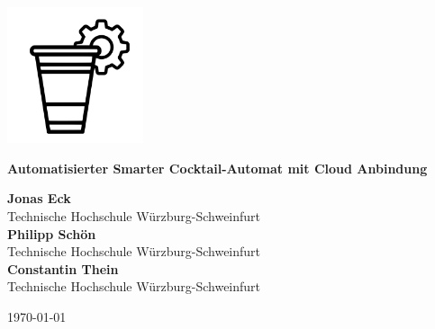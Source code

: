 \documentclass[a4paper, 10pt]{article} %
\begin{document}
\begin{titlepage}
    \begin{flushleft}
		\vspace*{-1.5cm}            %
		\hspace*{-1.0cm}           %
        \includegraphics[width=4cm]{graphics/images/smartender_logo.png} %
    \end{flushleft}

    \vspace*{-1.5cm}
	\centering
	\vspace*{1cm}
	{\Huge \bfseries Automatisierter Smarter Cocktail-Automat mit Cloud Anbindung\par}
  
	\vspace{2cm}
	{\large
	  \textbf{Jonas Eck}\\
	  Technische Hochschule Würzburg-Schweinfurt\\[1em]
	  \textbf{Philipp Schön}\\
	  Technische Hochschule Würzburg-Schweinfurt\\[1em]
	  \textbf{Constantin Thein}\\
	  Technische Hochschule Würzburg-Schweinfurt
	}
  
	\vspace{2cm}
	{\large \today\par}
  
	\vspace{2cm}
	\begin{abstract}
		\normalsize
		Im Rahmen dieses Projekts wurde ein smarter Cocktailautomat entwickelt, der wesentliche Elemente des Internet of Things (IoT) mit den Anforderungen moderner Smart-Home-Lösungen verbindet. Ziel war die Umsetzung eines skalierbaren Prototyps, der die automatisierte Zubereitung von
		Cocktails ermöglicht und dabei durch eine intuitive Bedienung über eine Smartphone-App sowie die Anbindung an ein cloudbasiertes Backend besticht.
	

\end{abstract}
\end{titlepage}
\end{document}
